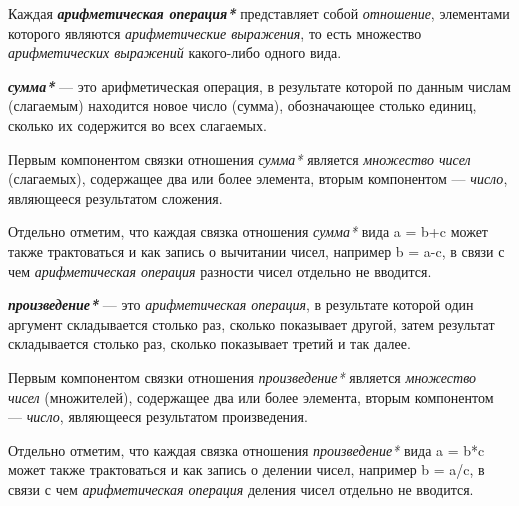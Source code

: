 \begin{SCn}
\begin{SCn}
\begin{SCn}
\end{SCn}

Каждая \textbf{\textit{арифметическая операция*}} представляет собой \textit{отношение}, элементами которого являются \textit{арифметические выражения}, то есть множество \textit{арифметических выражений} какого-либо одного вида.
	
\begin{SCn}
\end{SCn}

\textbf{\textit{сумма*}} --- это арифметическая операция, в результате которой по данным числам (слагаемым) находится новое число (сумма), обозначающее столько единиц, сколько их содержится во всех слагаемых.
		
Первым компонентом связки отношения \textit{сумма*} является \textit{множество чисел} (слагаемых), содержащее два или более элемента, вторым компонентом --- \textit{число}, являющееся результатом сложения.
		
Отдельно отметим, что каждая связка отношения \textit{сумма*} вида a = b+c может также трактоваться и как запись о вычитании чисел, например b = a-c, в связи с чем \textit{арифметическая операция} разности чисел отдельно не вводится.

\begin{SCn}
\end{SCn}

\textbf{\textit{произведение*}} --- это \textit{арифметическая операция}, в результате которой один аргумент складывается столько раз, сколько показывает другой, затем результат складывается столько раз, сколько показывает третий и так далее.
		
Первым компонентом связки отношения \textit{произведение*} является \textit{множество чисел} (множителей), содержащее два или более элемента, вторым компонентом --- \textit{число}, являющееся результатом произведения.
		
Отдельно отметим, что каждая связка отношения \textit{произведение*} вида a = b*c может также трактоваться и как запись о делении чисел, например b = a/c, в связи с чем \textit{арифметическая операция} деления чисел отдельно не вводится.


\end{SCn}
\end{SCn}
